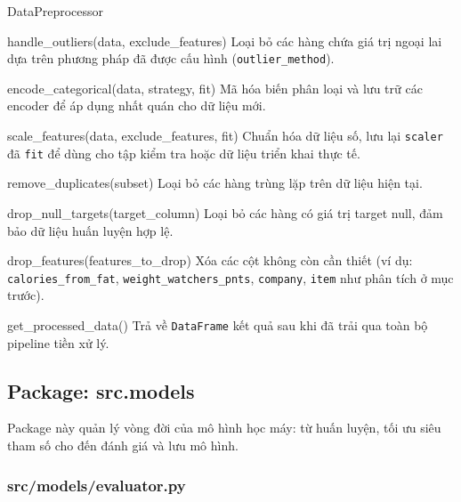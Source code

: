 \documentclass[12pt,a4paper]{article}
\newenvironment{methodlist}{
    \begin{description}[style=nextline, font=\ttfamily\color{sklearn-blue}]
}{
    \end{description}
}
\begin{document}
\begin{classbox}{DataPreprocessor}
\begin{methodlist}
    \item[handle\_outliers(data, exclude\_features)] 
    Loại bỏ các hàng chứa giá trị ngoại lai dựa trên phương pháp đã được cấu hình (\texttt{outlier\_method}).
    
    \item[encode\_categorical(data, strategy, fit)] 
    Mã hóa biến phân loại và lưu trữ các encoder để áp dụng nhất quán cho dữ liệu mới.
    
    \item[scale\_features(data, exclude\_features, fit)] 
    Chuẩn hóa dữ liệu số, lưu lại \texttt{scaler} đã \texttt{fit} để dùng cho tập kiểm tra hoặc dữ liệu triển khai thực tế.
    
    \item[remove\_duplicates(subset)] 
    Loại bỏ các hàng trùng lặp trên dữ liệu hiện tại.
    
    \item[drop\_null\_targets(target\_column)] 
    Loại bỏ các hàng có giá trị target null, đảm bảo dữ liệu huấn luyện hợp lệ.
    
    \item[drop\_features(features\_to\_drop)] 
    Xóa các cột không còn cần thiết (ví dụ: \texttt{calories\_from\_fat}, \texttt{weight\_watchers\_pnts}, \texttt{company}, \texttt{item} như phân tích ở mục trước).
    
    \item[get\_processed\_data()] 
    Trả về \texttt{DataFrame} kết quả sau khi đã trải qua toàn bộ pipeline tiền xử lý.
\end{methodlist}
\end{classbox}

\subsection{Package: src.models}

Package này quản lý vòng đời của mô hình học máy: từ huấn luyện, tối ưu siêu tham số cho đến đánh giá và lưu mô hình.

\subsubsection{src/models/evaluator.py}
\end{document}

